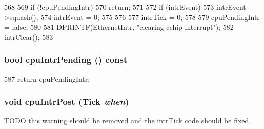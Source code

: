 \begin{DoxyCode}
568 {
569     if (!cpuPendingIntr)
570         return;
571 
572     if (intrEvent) {
573         intrEvent->squash();
574         intrEvent = 0;
575     }
576 
577     intrTick = 0;
578 
579     cpuPendingIntr = false;
580 
581     DPRINTF(EthernetIntr, "clearing cchip interrupt\n");
582     intrClear();
583 }
\end{DoxyCode}
\hypertarget{classSinic_1_1Base_a8f53e358ba260670dbc7296b35482316}{
\subsubsection[{cpuIntrPending}]{\setlength{\rightskip}{0pt plus 5cm}bool cpuIntrPending () const}}
\label{classSinic_1_1Base_a8f53e358ba260670dbc7296b35482316}



\begin{DoxyCode}
587 { return cpuPendingIntr; }
\end{DoxyCode}
\hypertarget{classSinic_1_1Base_af1fc872917f4ac5efa0d55c5c139bc9a}{
\subsubsection[{cpuIntrPost}]{\setlength{\rightskip}{0pt plus 5cm}void cpuIntrPost ({\bf Tick} {\em when})}}
\label{classSinic_1_1Base_af1fc872917f4ac5efa0d55c5c139bc9a}


\begin{Desc}
\item[\hyperlink{todo__todo000070}{TODO}]this warning should be removed and the intrTick code should be fixed. \end{Desc}



